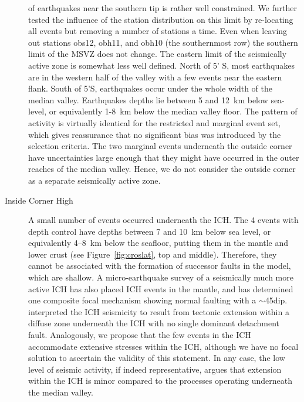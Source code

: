 \documentclass[jgr]{aguplus}
\newlength{\tw}
\begin{document}
\begin{article}
\begin{description}
of earthquakes near the southern tip is rather well constrained.  We
further tested the influence of the station distribution on this limit
by re-locating all events but removing a number of stations a time.
Even when leaving out stations obs12, obh11, and obh10 (the
southernmost row) the southern limit of the MSVZ
does not change.  The eastern limit of the seismically active zone is
somewhat less well defined.  North of 5' S, most earthquakes are
in the western half of the valley with a few events near the eastern
flank.  South of  5'S, earthquakes occur under the whole
width of the median valley. Earthquakes depths lie between 5 and 12~km
below sea-level, or equivalently 1-8~km below the median valley floor.  The pattern
of activity is virtually identical for the restricted and marginal
event set, which gives reassurance that no significant bias was
introduced by the selection criteria.
  The two marginal events
underneath the outside corner have uncertainties large enough that
they might have occurred in the outer reaches of the median valley. Hence, we
do not consider the outside corner as a separate seismically
active zone.

\item[Inside Corner High]  A small number of events occurred
underneath the ICH.  The  4 events with depth control have depths
between 7 and 10~km below sea level, or equivalently 4--8~km
below the seafloor, putting them in the mantle and lower
crust (see Figure~\ref{fig:croslat}, top and middle).
Therefore, they cannot be associated with the formation of successor
faults in the \citet{tucholke94} model, which are shallow.
A micro-earthquake survey of a  seismically much more active ICH
\citep[at 29\dg N,][]{wolfe95} has also placed ICH events in the
mantle, and has determined one composite focal mechanism showing
normal faulting with a $\sim$45\dg dip.  \citet{wolfe95} interpreted the ICH
seismicity to result from tectonic extension within a
diffuse zone underneath the ICH with no single dominant detachment
fault.  Analogously, we propose that the few events in the ICH
accommodate extensive stresses within the ICH, although we have no focal solution to
ascertain the validity of this statement.  In any case, the low level
of seismic activity, if indeed representative, argues that extension
within the ICH is minor compared to the processes operating underneath the
median valley.


\end{description}
\end{article}
\end{document}
